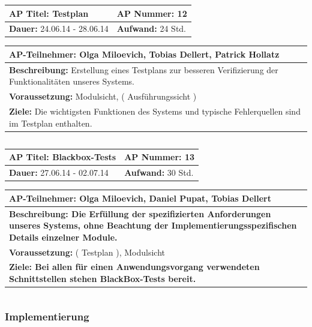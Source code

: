 \documentclass[fontsize=12pt,paper=a4,twoside]{scrartcl}
\begin{document}
\begin{tabular}{|p{7.43cm}|p{7.43cm}|}
\hline
\textbf{AP Titel: }Testplan & \textbf{AP Nummer: }12\\ 
\hline
\textbf{Dauer: }24.06.14 - 28.06.14& \textbf{Aufwand: }24 Std.\\
\hline
\end{tabular}
\begin{tabular}{|p{15.3cm}|}
\hline
\textbf{AP-Teilnehmer: }Olga Miloevich, Tobias Dellert, Patrick Hollatz\\
\hline
\textbf{Beschreibung: } Erstellung eines Testplans zur besseren Verifizierung der Funktionalitäten unseres Systems. \\
\hline
\textbf{Voraussetzung: }Modulsicht, ( Ausführungssicht )\\
\hline 
\textbf{Ziele: } Die wichtigsten Funktionen des Systems und typische Fehlerquellen sind im Testplan enthalten. \\
\hline 
\end{tabular}
\begin{verbatim}

\end{verbatim}

\begin{tabular}{|p{7.43cm}|p{7.43cm}|}
\hline
\textbf{AP Titel: }Blackbox-Tests & \textbf{AP Nummer: }13\\ 
\hline
\textbf{Dauer: }27.06.14 - 02.07.14& \textbf{Aufwand: }30 Std.\\
\hline
\end{tabular}
\begin{tabular}{|p{15.3cm}|}
\hline
\textbf{AP-Teilnehmer: }Olga Miloevich, Daniel Pupat, Tobias Dellert\\
\hline
\textbf{Beschreibung: Die Erfüllung der spezifizierten Anforderungen unseres Systems, ohne
Beachtung der Implementierungsspezifischen Details einzelner Module.}\\
\hline
\textbf{Voraussetzung: }( Testplan ), Modulsicht\\
\hline 
\textbf{Ziele: Bei allen für einen Anwendungsvorgang verwendeten Schnittstellen stehen BlackBox-Tests bereit.}\\
\hline 
\end{tabular}
\begin{verbatim}

\end{verbatim}



\subsubsection{Implementierung}\label{aps}
\end{document}
